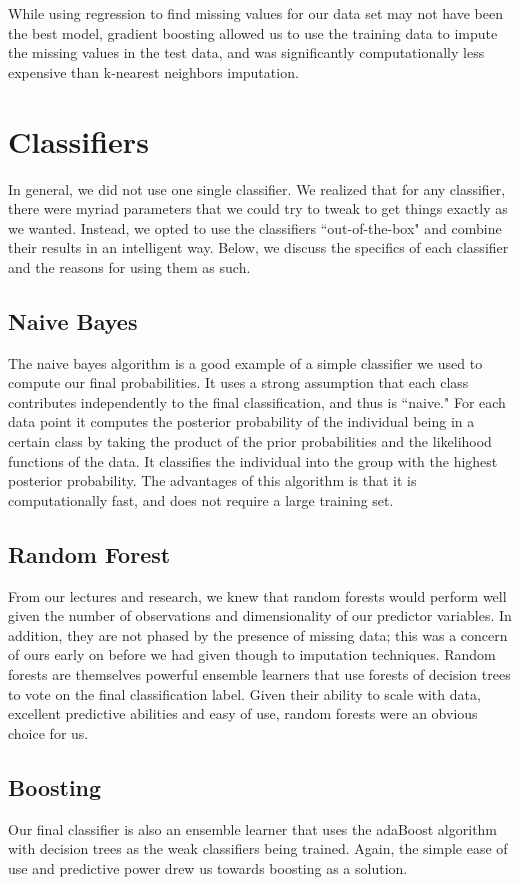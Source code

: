\documentclass[11pt, oneside]{article}   	%
\begin{document}
	While using regression to find missing values for our data set may not have been
	the best model, gradient boosting allowed us to use the training data to impute the missing 
	values in the test data, and was significantly computationally less expensive than k-nearest
	neighbors imputation. 
\section{Classifiers}
In general, we did not use one single classifier. We realized that for any classifier, there were myriad
parameters that we could try to tweak to get things exactly as we wanted. Instead, we 
opted to use the classifiers ``out-of-the-box" and combine their results in an intelligent way. 
Below, we discuss the specifics of each classifier and the reasons for using them as such.
	\subsection{Naive Bayes}
	The naive bayes algorithm is a good example of a simple classifier we used to compute our 
	final probabilities. It uses a strong assumption that each class contributes independently to the final classification, and thus is ``naive." For each data point it computes the posterior probability of the individual being in a certain class by taking the product of the prior probabilities and the likelihood functions of the data. It classifies the individual into the group with the highest posterior probability. The advantages of this algorithm is that it is computationally fast, and does not require a large training set. 
	\subsection{Random Forest}
	From our lectures
	and research, we knew that random forests would perform well given the number of
	observations and dimensionality of our predictor variables. In addition, they are not phased by the
	presence of missing data; this was a concern of ours early on before we had given though
	to imputation techniques. Random forests are themselves powerful ensemble learners that 
	use forests of decision trees to vote on the final classification label. Given their
	ability to scale with data, excellent predictive abilities and easy of use, random forests were an obvious choice for us.
	\subsection{Boosting}
	Our final classifier is also an ensemble learner that uses the adaBoost algorithm with decision 
	trees as the weak classifiers being trained. Again, the simple ease of use and predictive
	power drew us towards boosting as a solution. 
	
\end{document}
